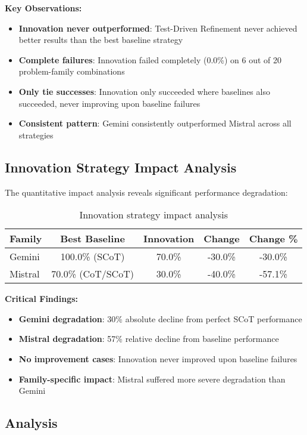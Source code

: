 \documentclass[11pt]{article}
\begin{document}
\textbf{Key Observations:}
\begin{itemize}
    \item \textbf{Innovation never outperformed}: Test-Driven Refinement never achieved better results than the best baseline strategy
    \item \textbf{Complete failures}: Innovation failed completely (0.0\%) on 6 out of 20 problem-family combinations
    \item \textbf{Only tie successes}: Innovation only succeeded where baselines also succeeded, never improving upon baseline failures
    \item \textbf{Consistent pattern}: Gemini consistently outperformed Mistral across all strategies
\end{itemize}

\subsection{Innovation Strategy Impact Analysis}

The quantitative impact analysis reveals significant performance degradation:

\begin{table}[h]
\centering
\begin{tabular}{|l|c|c|c|c|}
\hline
\textbf{Family} & \textbf{Best Baseline} & \textbf{Innovation} & \textbf{Change} & \textbf{Change \%} \\
\hline
Gemini & 100.0\% (SCoT) & 70.0\% & -30.0\% & -30.0\% \\
Mistral & 70.0\% (CoT/SCoT) & 30.0\% & -40.0\% & -57.1\% \\
\hline
\end{tabular}
\caption{Innovation strategy impact analysis}
\end{table}

\textbf{Critical Findings:}
\begin{itemize}
    \item \textbf{Gemini degradation}: 30\% absolute decline from perfect SCoT performance
    \item \textbf{Mistral degradation}: 57\% relative decline from baseline performance
    \item \textbf{No improvement cases}: Innovation never improved upon baseline failures
    \item \textbf{Family-specific impact}: Mistral suffered more severe degradation than Gemini
\end{itemize}

\subsection{Analysis}
\end{document}
